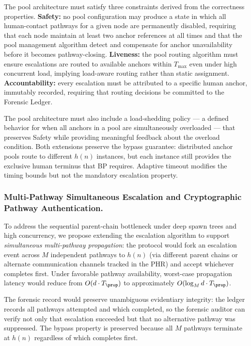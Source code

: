 The pool architecture must satisfy three constraints derived from the correctness properties. \textbf{Safety:} no pool configuration may produce a state in which all human-contact pathways for a given node are permanently disabled, requiring that each node maintain at least two anchor references at all times and that the pool management algorithm detect and compensate for anchor unavailability before it becomes pathway-closing. \textbf{Liveness:} the pool routing algorithm must ensure escalations are routed to available anchors within $T_{\max}$ even under high concurrent load, implying load-aware routing rather than static assignment. \textbf{Accountability:} every escalation must be attributed to a specific human anchor, immutably recorded, requiring that routing decisions be committed to the Forensic Ledger.

The pool architecture must also include a load-shedding policy --- a defined behavior for when all anchors in a pool are simultaneously overloaded --- that preserves Safety while providing meaningful feedback about the overload condition. Both extensions preserve the bypass guarantee: distributed anchor pools route to different $h(n)$ instances, but each instance still provides the exclusive human terminus that BP requires. Adaptive timeout modifies the timing bounds but not the mandatory escalation property.

\subsubsection{Multi-Pathway Simultaneous Escalation and Cryptographic Pathway Authentication.}

To address the sequential parent-chain bottleneck under deep spawn trees and high concurrency, we propose extending the escalation algorithm to support \emph{simultaneous multi-pathway propagation}: the protocol would fork an escalation event across $M$ independent pathways to $h(n)$ (via different parent chains or alternate communication channels tracked in the PHR) and accept whichever completes first. Under favorable pathway availability, worst-case propagation latency would reduce from $O(d \cdot T_{\prop})$ to approximately $O(\log_M d \cdot T_{\prop})$.

The forensic record would preserve unambiguous evidentiary integrity: the ledger records all pathways attempted and which completed, so the forensic auditor can verify not only that escalation succeeded but that no alternative pathway was suppressed. The bypass property is preserved because all $M$ pathways terminate at $h(n)$ regardless of which completes first.

